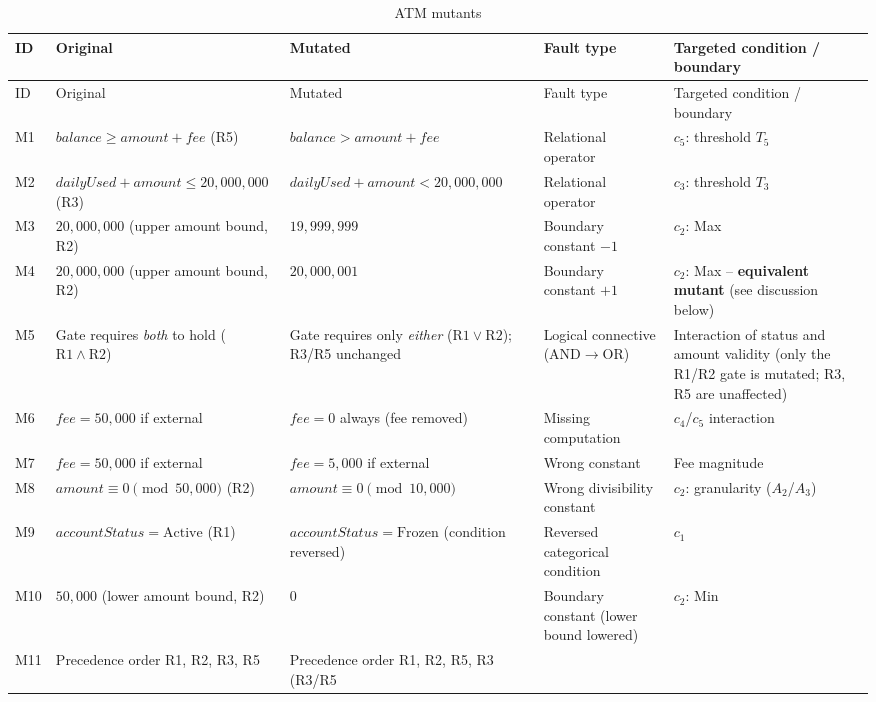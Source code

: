 \documentclass[11pt,a4paper]{article}
\begin{document}
\begingroup\small
\begin{xltabular}{\textwidth}{@{}l L{3.5cm} L{3.7cm} L{2.0cm} Y@{}}
\caption{ATM mutants} \label{tab:atm-mutants}\\
\toprule
ID & Original & Mutated & Fault type & Targeted condition / boundary \\
\midrule
\endfirsthead
\toprule
ID & Original & Mutated & Fault type & Targeted condition / boundary \\
\midrule
\endhead
\bottomrule
\endfoot
M1 & \(\mathit{balance}\ge \mathit{amount}+\mathit{fee}\) (R5) &
\(\mathit{balance} > \mathit{amount}+\mathit{fee}\) & Relational operator &
\(c_5\): threshold \(T_5\) \\
M2 & \(\mathit{dailyUsed}+\mathit{amount}\le 20{,}000{,}000\) (R3) &
\(\mathit{dailyUsed}+\mathit{amount} < 20{,}000{,}000\) & Relational operator &
\(c_3\): threshold \(T_3\) \\
M3 & $20{,}000{,}000$ (upper amount bound, R2) & $19{,}999{,}999$ &
Boundary constant \(-1\) & \(c_2\): Max \\
M4 & $20{,}000{,}000$ (upper amount bound, R2) & $20{,}000{,}001$ &
Boundary constant \(+1\) & \(c_2\): Max --
\textbf{equivalent mutant} (see discussion below) \\
M5 & Gate requires \emph{both} to hold
(\(\mathrm{R1}\wedge\mathrm{R2}\)) & Gate requires only \emph{either}
(\(\mathrm{R1}\vee\mathrm{R2}\)); R3/R5 unchanged
& Logical connective (AND\(\to\)OR) & Interaction of status and amount
validity (only the R1/R2 gate is mutated; R3, R5 are unaffected) \\
M6 & \(\mathit{fee}=50{,}000\) if external & \(\mathit{fee}=0\) always
(fee removed) & Missing computation & \(c_4\)/\(c_5\) interaction \\
M7 & \(\mathit{fee}=50{,}000\) if external & \(\mathit{fee}=5{,}000\) if
external & Wrong constant & Fee magnitude \\
M8 & \(\mathit{amount}\equiv 0 \pmod{50{,}000}\) (R2) &
\(\mathit{amount}\equiv 0 \pmod{10{,}000}\) & Wrong divisibility constant &
\(c_2\): granularity (\(A_2\)/\(A_3\)) \\
M9 & \(\mathit{accountStatus}=\mathrm{Active}\) (R1) &
\(\mathit{accountStatus}=\mathrm{Frozen}\) (condition reversed) &
Reversed categorical condition & \(c_1\) \\
M10 & $50{,}000$ (lower amount bound, R2) & $0$ & Boundary constant
(lower bound lowered) & \(c_2\): Min \\
M11 & Precedence order R1, R2, R3, R5 & Precedence order R1, R2, R5, R3 (R3/R5

\end{xltabular}
\end{document}
